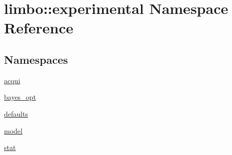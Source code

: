 \hypertarget{namespacelimbo_1_1experimental}{}\section{limbo\+:\+:experimental Namespace Reference}
\label{namespacelimbo_1_1experimental}
\subsection*{Namespaces}
\begin{DoxyCompactItemize}
\item 
 \hyperlink{namespacelimbo_1_1experimental_1_1acqui}{acqui}
\item 
 \hyperlink{namespacelimbo_1_1experimental_1_1bayes__opt}{bayes\+\_\+opt}
\item 
 \hyperlink{namespacelimbo_1_1experimental_1_1defaults}{defaults}
\item 
 \hyperlink{namespacelimbo_1_1experimental_1_1model}{model}
\item 
 \hyperlink{namespacelimbo_1_1experimental_1_1stat}{stat}
\end{DoxyCompactItemize}
